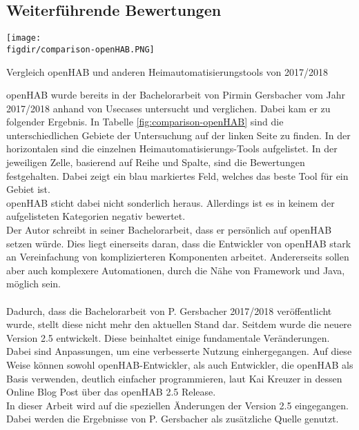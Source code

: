 \subsection{Weiterführende Bewertungen}
\begin{minipage}{\textwidth}
	\centering
	\captionsetup{type=figure}
	\texttt{[image: \\figdir/comparison-openHAB.PNG]}
	\caption{Vergleich openHAB und anderen Heimautomatisierungstools von 2017/2018 \label{fig:comparison-openHAB}}
\end{minipage}
\smallskip
openHAB wurde bereits in der Bachelorarbeit von Pirmin Gersbacher vom Jahr 2017/2018 anhand von Usecases untersucht und verglichen. Dabei kam er zu folgender Ergebnis.
In Tabelle \ref{fig:comparison-openHAB} sind die unterschiedlichen Gebiete der Untersuchung auf der linken Seite zu finden. In der horizontalen sind die einzelnen Heimautomatisierungs-Tools aufgelistet. In der jeweiligen Zelle, basierend auf Reihe und Spalte, sind die Bewertungen festgehalten. Dabei zeigt ein blau markiertes Feld, welches das beste Tool für ein Gebiet ist.\\
openHAB sticht dabei nicht sonderlich heraus. Allerdings ist es in keinem der aufgelisteten Kategorien negativ bewertet.\\
Der Autor schreibt in seiner Bachelorarbeit, dass er persönlich auf openHAB setzen würde. Dies liegt einerseits daran, dass die Entwickler von openHAB stark an Vereinfachung von komplizierteren Komponenten arbeitet. Andererseits sollen aber auch komplexere Automationen, durch die Nähe von Framework und Java, möglich sein.\cite{BA01:OPH}
\\
\\
Dadurch, dass die Bachelorarbeit von P. Gersbacher 2017/2018 veröffentlicht wurde, stellt diese nicht mehr den aktuellen Stand dar. Seitdem wurde die neuere Version 2.5 entwickelt. Diese beinhaltet einige fundamentale Veränderungen. Dabei sind Anpassungen, um eine verbesserte Nutzung einhergegangen. Auf diese Weise können sowohl openHAB-Entwickler, als auch Entwickler, die openHAB als Basis verwenden, deutlich einfacher programmieren, laut Kai Kreuzer in dessen Online Blog Post über das openHAB 2.5 Release.\cite{openHAB02:OH}\\
In dieser Arbeit wird auf die speziellen Änderungen der Version 2.5 eingegangen. Dabei werden die Ergebnisse von P. Gersbacher als zusätzliche Quelle genutzt.


